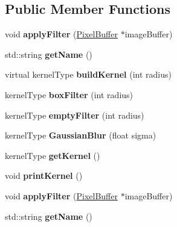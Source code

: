 \subsection*{Public Member Functions}
\begin{DoxyCompactItemize}
\item 
\hypertarget{classFBlur_a20d9f9bb8f2b787273a860779853a8fd}{void {\bfseries apply\-Filter} (\hyperlink{classPixelBuffer}{Pixel\-Buffer} $\ast$image\-Buffer)}\label{classFBlur_a20d9f9bb8f2b787273a860779853a8fd}

\item 
\hypertarget{classFBlur_a3c121581f48e00e0267f88826808ee23}{std\-::string {\bfseries get\-Name} ()}\label{classFBlur_a3c121581f48e00e0267f88826808ee23}

\item 
\hypertarget{classFBlur_ad7d9aa0fa6b3b4f4ead1545ccf6a6628}{virtual kernel\-Type {\bfseries build\-Kernel} (int radius)}\label{classFBlur_ad7d9aa0fa6b3b4f4ead1545ccf6a6628}

\item 
\hypertarget{classFBlur_a97ca2bede17042bae70d781859d46e73}{kernel\-Type {\bfseries box\-Filter} (int radius)}\label{classFBlur_a97ca2bede17042bae70d781859d46e73}

\item 
\hypertarget{classFBlur_ab13f7d8c36423e3f0ecabdcd9b045fbf}{kernel\-Type {\bfseries empty\-Filter} (int radius)}\label{classFBlur_ab13f7d8c36423e3f0ecabdcd9b045fbf}

\item 
\hypertarget{classFBlur_ad88afc728cb9b8c84443a0bf4a30983f}{kernel\-Type {\bfseries Gaussian\-Blur} (float sigma)}\label{classFBlur_ad88afc728cb9b8c84443a0bf4a30983f}

\item 
\hypertarget{classFBlur_a7cb16fe19cd319be83d95de5686e8d39}{kernel\-Type {\bfseries get\-Kernel} ()}\label{classFBlur_a7cb16fe19cd319be83d95de5686e8d39}

\item 
\hypertarget{classFBlur_a5f500e9bad040039fb43e58be03d57e6}{void {\bfseries print\-Kernel} ()}\label{classFBlur_a5f500e9bad040039fb43e58be03d57e6}

\item 
\hypertarget{classFBlur_a20d9f9bb8f2b787273a860779853a8fd}{void {\bfseries apply\-Filter} (\hyperlink{classPixelBuffer}{Pixel\-Buffer} $\ast$image\-Buffer)}\label{classFBlur_a20d9f9bb8f2b787273a860779853a8fd}

\item 
\hypertarget{classFBlur_a3c121581f48e00e0267f88826808ee23}{std\-::string {\bfseries get\-Name} ()}\label{classFBlur_a3c121581f48e00e0267f88826808ee23}


\end{DoxyCompactItemize}
